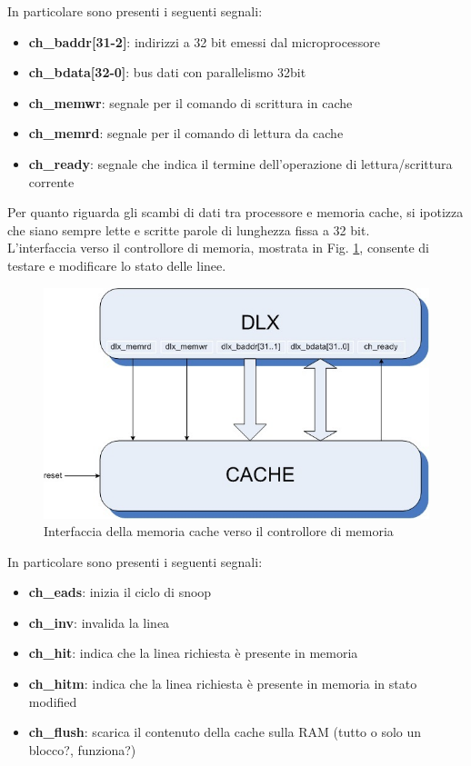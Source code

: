 In particolare sono presenti i seguenti segnali:
\begin{itemize} %
\item \textbf{ch\_baddr[31-2]}: indirizzi a 32 bit emessi dal microprocessore
\item \textbf{ch\_bdata[32-0]}: bus dati con parallelismo 32bit 
\item \textbf{ch\_memwr}: segnale per il comando di scrittura in cache
\item \textbf{ch\_memrd}: segnale per il comando di lettura da cache
\item \textbf{ch\_ready}: segnale che indica il termine dell'operazione di lettura/scrittura corrente
\end{itemize}

Per quanto riguarda gli scambi di dati tra processore e memoria cache, si ipotizza che siano sempre lette e scritte parole di lunghezza fissa a 32 bit.\\

L'interfaccia verso il controllore di memoria, mostrata in Fig. \ref{fig:int_cnt}, consente di testare e modificare lo stato delle linee.\\

\begin{figure}[h!]
\centering
\includegraphics[width=\textwidth]{img/dlx-cache.jpg} %
\caption{Interfaccia della memoria cache verso il controllore di memoria}
\label{fig:int_cnt}
\end{figure}

In particolare sono presenti i seguenti segnali:
\begin{itemize} %
\item \textbf{ch\_eads}: inizia il ciclo di snoop
\item \textbf{ch\_inv}: invalida la linea
\item \textbf{ch\_hit}: indica che la linea richiesta \`e presente in memoria
\item \textbf{ch\_hitm}: indica che la linea richiesta \`e presente in memoria in stato modified
\item \textbf{ch\_flush}: scarica il contenuto della cache sulla RAM (tutto o solo un blocco?, funziona?)
\end{itemize}


